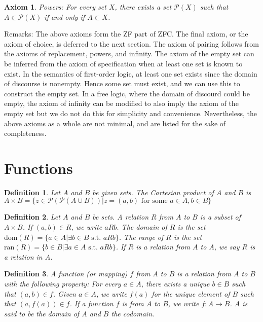 \documentclass[a4paper]{article}
\newtheorem{axiom}{Axiom}
\newtheorem{mydef}{Definition}
\numberwithin{mytheorem}{section}
\numberwithin{mydef}{section}
\numberwithin{axiom}{section}
\numberwithin{example}{section}
\begin{document}
\begin{axiom} Powers: For every set $X$, there exists a set $\mathcal{P}(X)$ such that $A \in \mathcal{P}(X)$ if and only if $A \subset X$.
\end{axiom}

Remarks: The above axioms form the ZF part of ZFC. The final axiom, or the axiom of choice, is deferred to the next section. The axiom of pairing follows from the axioms of replacement, powers, and infinity. The axiom of the empty set can be inferred from the axiom of specification when at least one set is known to exist. In the semantics of first-order logic, at least one set exists since the domain of discourse is nonempty. Hence some set must exist, and we can use this to construct the empty set. In a free logic, where the domain of discourd could be empty, the axiom of infinity can be modified to also imply the axiom of the empty set but we do not do this for simplicity and convenience. Nevertheless, the above axioms as a whole are not minimal, and are listed for the sake of completeness. 

\section{Functions}

\begin{mydef} Let $A$ and $B$ be given sets. The Cartesian product of $A$ and $B$ is $A \times B = \{ z \in \mathcal{P}(\mathcal{P}(A \cup B)) | z = (a,b) \text{ for some } a \in A, b \in B \}$
\end{mydef}

\begin{mydef} Let $A$ and $B$ be sets. A relation $R$ from $A$ to $B$ is a subset of $A \times B$. If $(a,b) \in R$, we write $a R b$. The domain of $R$ is the set $\text{dom}(R)  = \{ a \in A | \exists b \in B \text{ s.t. } a R b\}$. The range of $R$ is the set  $\text{ran}(R)  = \{ b \in B | \exists a \in A \text{ s.t. } a R b\}$. If $R$ is a relation from $A$ to $A$, we say $R$ is a relation in $A$.
\end{mydef}

\begin{mydef} A function (or mapping) $f$ from $A$ to $B$ is a relation from $A$ to $B$ with the following property: For every $a \in A$, there exists a unique $b \in B$ such that $(a,b) \in f$. Given $a \in A$, we write $f(a)$  for the unique element of $B$ such that $(a,f(a)) \in f$. If a function $f$ is from $A$ to $B$, we write $f: A \rightarrow B$. $A$ is said to be the domain of $A$ and $B$ the codomain.
\end{mydef}
\end{document}
